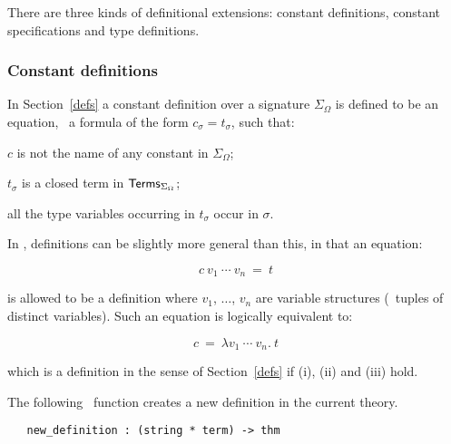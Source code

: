 There are three kinds of definitional extensions:
constant definitions, constant specifications and type definitions.

\subsubsection{Constant definitions}

In Section~\ref{defs} a constant definition
over a signature $\Sigma_{\Omega}$ is defined to be
an equation, \ie\ a formula of the form $c_{\sigma}=t_{\sigma}$,
such that:
\begin{myenumerate}
\item $c$ is not the name of any constant in $\Sigma_{\Omega}$;
\item $t_{\sigma}$ is a closed term in ${\sf Terms}_{\Sigma_{\Omega}}$;
\item all the type variables occurring in $t_{\sigma}$ occur in $\sigma$.
\end{myenumerate}

In \HOL, definitions can be slightly more general than this, in that
an equation:

\[ c\ v_1\ \cdots\ v_n\ =\ t \]

\noindent is  allowed  to  be a  definition where  $v_1$, $\dots$, $v_n$ are
variable structures (\ie\ tuples of distinct variables).   Such  an equation is
logically equivalent to:

\[ c\ =\ \lambda v_1\ \cdots\ v_n.\  t \]

\noindent which is a definition in the sense of  Section~\ref{defs} if (i),
(ii) and (iii) hold.

The following  \ML\ function  creates a  new definition in
the current theory.

\begin{boxed}
\begin{verbatim}
   new_definition : (string * term) -> thm
\end{verbatim}\end{boxed}


